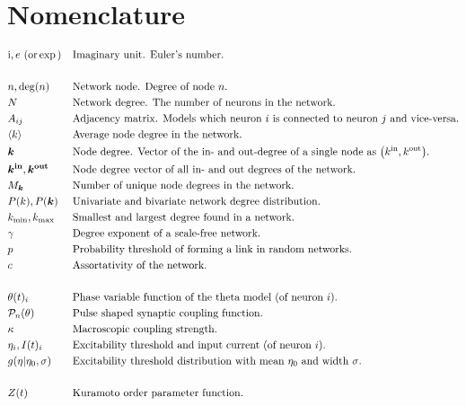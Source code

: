 \newpage
\section{Nomenclature}
\vspace{-.5cm}
\begin{alignat*}{2}
& \ic, e \text{ (or} \exp\text{)} &&\text{Imaginary unit. Euler's number.}\\ \\
& n, \degree(n) &&\text{Network node. Degree of node $n$.}\\
& N &&\text{Network degree. The number of neurons in the network.}\\
& A_{ij} &&\text{Adjacency matrix. Models which neuron $i$ is connected to neuron $j$ and vice-versa.}\\
& \kmean &&\text{Average node degree in the network.}\\
& \k &&\text{Node degree. Vector of the in- and out-degree of a single node as $\left(\kin, \kout \right)$.}\\
& \kinb, \koutb && \text{Node degree vector of all in- and out degrees of the network.} \\
& M_{\k} &&\text{Number of unique node degrees in the network.}\\
& P(k), P(\k) &&\text{Univariate and bivariate network degree distribution.}\\
&\kmin, \kmax &&\text{Smallest and largest degree found in a network.}\\ 
&\gamma &&\text{Degree exponent of a scale-free network.}\\ 
&p &&\text{Probability threshold of forming a link in random networks.}\\ 
&c &&\text{Assortativity of the network.}\\ \\
&\theta(t)_i &&\text{Phase variable function of the theta model (of neuron $i$).}\\
& \Pulse_n (\theta)&&\text{Pulse shaped synaptic coupling function.}\\
&\kappa &&\text{Macroscopic coupling strength.}\\
&\eta_i, I(t)_i &&\text{Excitability threshold and input current (of neuron $i$).}\\
&g(\eta \rvert \eta_0, \sigma) \quad &&\text{Excitability threshold distribution with mean $\eta_0$ and width $\sigma$.}\\ \\
& Z(t) &&\text{Kuramoto order parameter function.}\\

\end{alignat*}
